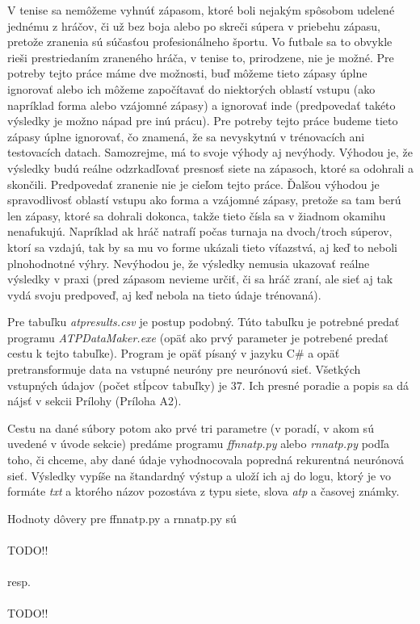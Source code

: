 V tenise sa nemôžeme vyhnúť zápasom, ktoré boli nejakým spôsobom udelené jednému z hráčov, či už bez boja alebo po skreči súpera v priebehu zápasu, pretože zranenia sú súčasťou profesionálneho športu.
Vo futbale sa to obvykle rieši prestriedaním zraneného hráča, v tenise to, prirodzene, nie je možné.
Pre potreby tejto práce máme dve možnosti, buď môžeme tieto zápasy úplne ignorovať alebo ich môžeme započítavať do niektorých oblastí vstupu (ako napríklad forma alebo vzájomné zápasy) a ignorovať inde (predpovedať takéto výsledky je možno nápad pre inú prácu). 
Pre potreby tejto práce budeme tieto zápasy úplne ignorovať, čo znamená, že sa nevyskytnú v trénovacích ani testovacích datach.
Samozrejme, má to svoje výhody aj nevýhody.
Výhodou je, že výsledky budú reálne odzrkadľovať presnosť siete na zápasoch, ktoré sa odohrali a skončili.
Predpovedať zranenie nie je cieľom tejto práce.
Ďalšou výhodou je spravodlivosť oblastí vstupu ako forma a vzájomné zápasy, pretože sa tam berú len zápasy, ktoré sa dohrali dokonca, takže tieto čísla sa v žiadnom okamihu nenafukujú. Napríklad ak hráč natrafí počas turnaja na dvoch/troch súperov, ktorí sa vzdajú, tak by sa mu vo forme ukázali tieto víťazstvá, aj keď to neboli plnohodnotné výhry.
Nevýhodou je, že výsledky nemusia ukazovať reálne výsledky v praxi (pred zápasom nevieme určiť, či sa hráč zraní, ale sieť aj tak vydá svoju predpoveď, aj keď nebola na tieto údaje trénovaná).

Pre tabuľku \textit{atpresults.csv} je postup podobný. 
Túto tabuľku je potrebné predať programu \textit{ATPDataMaker.exe} (opäť ako prvý parameter je potrebené predať cestu k tejto tabuľke).
Program je opäť písaný v jazyku C\# a opäť pretransformuje data na vstupné neuróny pre neurónovú sieť.
Všetkých vstupných údajov (počet stĺpcov tabuľky) je 37.
Ich presné poradie a popis sa dá nájsť v sekcii Prílohy (Príloha A2).

Cestu na dané súbory potom ako prvé tri parametre (v poradí, v akom sú uvedené v úvode sekcie) predáme programu \textit{ffnnatp.py} alebo \textit{rnnatp.py} podľa toho, či chceme, aby dané údaje vyhodnocovala popredná rekurentná neurónová sieť.
Výsledky vypíše na štandardný výstup a uloží ich aj do logu, ktorý je vo formáte \textit{txt} a ktorého názov pozostáva z typu siete, slova \textit{atp} a časovej známky.

Hodnoty dôvery pre ffnnatp.py a rnnatp.py sú \\\\
TODO!!\\\\
resp.\\\\
TODO!!\\\\
